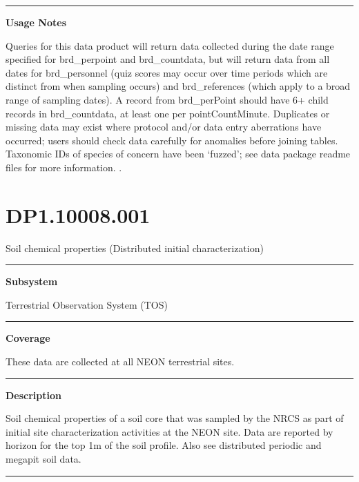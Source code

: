 \documentclass[]{article}
\begin{document}
\begin{center}\rule{0.5\linewidth}{\linethickness}\end{center}

\textbf{Usage Notes}

Queries for this data product will return data collected during the date
range specified for brd\_perpoint and brd\_countdata, but will return
data from all dates for brd\_personnel (quiz scores may occur over time
periods which are distinct from when sampling occurs) and
brd\_references (which apply to a broad range of sampling dates). A
record from brd\_perPoint should have 6+ child records in
brd\_countdata, at least one per pointCountMinute. Duplicates or missing
data may exist where protocol and/or data entry aberrations have
occurred; users should check data carefully for anomalies before joining
tables. Taxonomic IDs of species of concern have been `fuzzed'; see data
package readme files for more information. \newpage
.

\section{DP1.10008.001}\label{dp1.10008.001}

Soil chemical properties (Distributed initial characterization)

\begin{center}\rule{0.5\linewidth}{\linethickness}\end{center}

\textbf{Subsystem}

Terrestrial Observation System (TOS)

\begin{center}\rule{0.5\linewidth}{\linethickness}\end{center}

\textbf{Coverage}

These data are collected at all NEON terrestrial sites.

\begin{center}\rule{0.5\linewidth}{\linethickness}\end{center}

\textbf{Description}

Soil chemical properties of a soil core that was sampled by the NRCS as
part of initial site characterization activities at the NEON site. Data
are reported by horizon for the top 1m of the soil profile. Also see
distributed periodic and megapit soil data.

\begin{center}\rule{0.5\linewidth}{\linethickness}\end{center}
\end{document}
